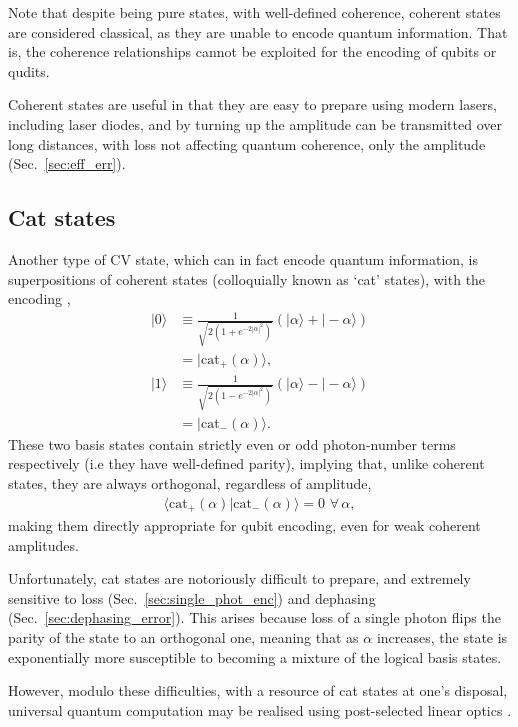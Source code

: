 \documentclass[aps,rmp,twocolumn,amsmath,amssymb,nofootinbib,superscriptaddress,longbibliography,floatfix,table-of-contents,eqsecnum]{revtex4-1}
\newcommand{\ket}[1]{|#1\rangle}
\begin{document}
Note that despite being pure states, with well-defined coherence, coherent states are considered classical, as they are unable to encode quantum information. That is, the coherence relationships cannot be exploited for the encoding of qubits or qudits.

Coherent states are useful in that they are easy to prepare using modern lasers, including laser diodes, and by turning up the amplitude can be transmitted over long distances, with loss not affecting quantum coherence, only the amplitude (Sec.~\ref{sec:eff_err}).

%
%

\subsection{Cat states} \label{sec:cat_enc} 

Another type of CV state, which can in fact encode quantum information, is superpositions of coherent states (colloquially known as `cat' states), with the encoding \cite{???},
\begin{align}
\ket{0} &\equiv \frac{1}{\sqrt{2(1+e^{-2|\alpha|^2})}} (\ket{\alpha}+\ket{-\alpha}) \nonumber \\
&= \ket{\text{cat}_+(\alpha)},\nonumber \\
\ket{1} &\equiv \frac{1}{\sqrt{2(1-e^{-2|\alpha|^2})}}(\ket{\alpha}-\ket{-\alpha}) \nonumber \\
&= \ket{\text{cat}_-(\alpha)}.
\end{align}
These two basis states contain strictly even or odd photon-number terms respectively (i.e they have well-defined parity), implying that, unlike coherent states, they are always orthogonal, regardless of amplitude,
\begin{align}
\langle\text{cat}_+(\alpha)|\text{cat}_-(\alpha)\rangle = 0 \,\,\forall\,\alpha,
\end{align}
making them directly appropriate for qubit encoding, even for weak coherent amplitudes.

Unfortunately, cat states are notoriously difficult to prepare, and extremely sensitive to loss (Sec.~\ref{sec:single_phot_enc}) and dephasing (Sec.~\ref{sec:dephasing_error}). This arises because loss of a single photon flips the parity of the state to an orthogonal one, meaning that as $\alpha$ increases, the state is exponentially more susceptible to becoming a mixture of the logical basis states.

However, modulo these difficulties, with a resource of cat states at one's disposal, universal quantum computation may be realised using post-selected linear optics \cite{bib:JeongRalph05, bib:Gilchrist04}.
\end{document}
